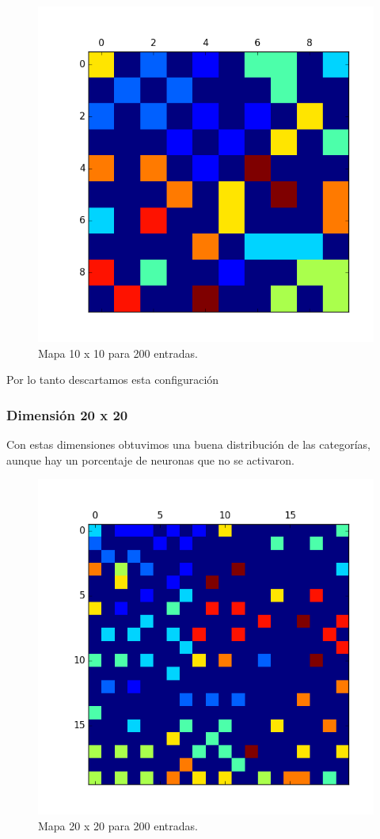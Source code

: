 \begin{figure}[H]
  \centering
  \includegraphics[width=0.8\columnwidth]{../graficos/mapa1010.png}
  \caption{Mapa 10 x 10 para 200 entradas.}
  \label{fig:mapa 10 10 200}
\end{figure}


Por lo tanto descartamos esta configuración

\subsubsection{Dimensión 20 x 20 }

Con estas dimensiones obtuvimos una buena distribución de las categorías,
aunque hay un porcentaje de neuronas que no se activaron.

\begin{figure}[H]
  \centering
  \includegraphics[width=0.8\columnwidth]{../graficos/mapa2020.png}
  \caption{Mapa 20 x 20 para 200 entradas.}
  \label{fig:mapa 20 20 200}
\end{figure}


